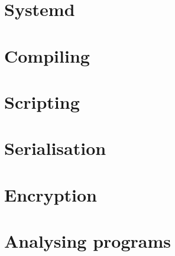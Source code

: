 \documentclass[oneside]{book}
\begin{document}

\part{Systemd}

\part{Compiling}









\part{Scripting}





\part{Serialisation}





\part{Encryption}



\part{Analysing programs}




\end{document}

